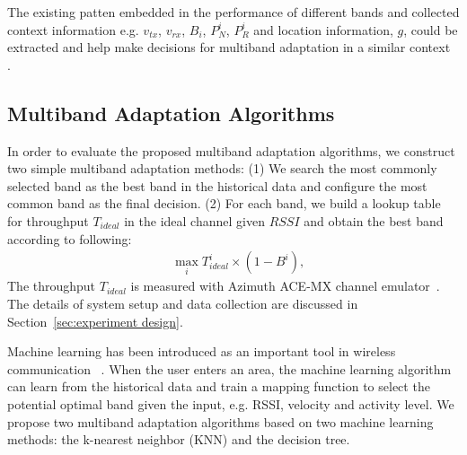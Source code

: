 The existing patten embedded in the performance of different bands and 
collected context information e.g. $v_{tx}$, $v_{rx}$, $B_i$, $P_N^i$, $P_R^i$ 
and location information, $g$, could be extracted and help make decisions
for multiband adaptation in a similar context~\cite{meikle2012global} .

\subsection{Multiband Adaptation Algorithms}
In order to evaluate the proposed multiband adaptation algorithms, 
we construct two simple multiband adaptation methods: (1) We search the
most commonly selected band as the best band in the historical data
and configure the most common band as the final decision. (2) For each band, we build 
a lookup table for throughput $T_{ideal}$ in the ideal channel given $RSSI$ and obtain 
the best band according to following:
\begin{align}
&\max_i T_{ideal}^i\times(1-B^i),
\label{eq:baseline2}
\end{align}
The throughput $T_{ideal}$ is measured with Azimuth ACE-MX channel emulator~\cite{AzimuthACE}. 
The details of system setup and data collection are discussed in Section~\ref{sec:experiment design}. 

Machine learning has been introduced as an important tool in wireless communication
~\cite{haykin2005cognitive}. When the user enters an area, the machine
learning algorithm can learn from the historical data and train a mapping 
function to select the potential optimal band given the input, e.g. RSSI, velocity 
and activity level. We propose two multiband adaptation algorithms based on
two machine learning methods: the k-nearest neighbor (KNN) and the decision tree.


